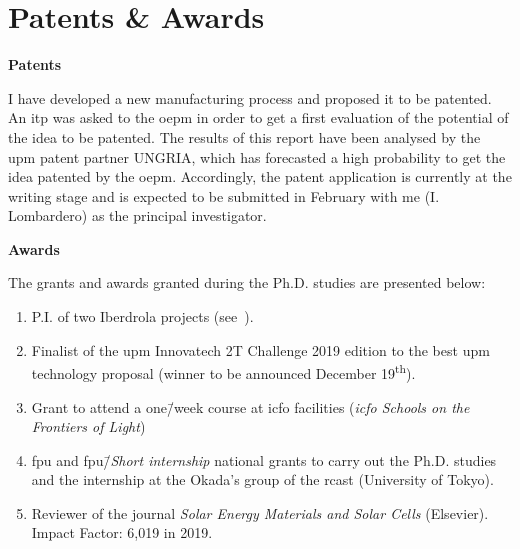 \chapter*{Patents \& Awards}\label{ch:Patents_Awards}

\begin{Large}
	\noindent\textbf{Patents}
\end{Large}

I have developed a new manufacturing process and proposed it to be patented. An \gls{itp} was asked to the \gls{oepm} in order to get a first evaluation of the potential of the idea to be patented. The results of this report have been analysed by the \gls{upm} patent partner UNGRIA, which has forecasted a high probability to get the idea patented by the \gls{oepm}. Accordingly, the patent application is currently at the writing stage and is expected to be submitted in February with me (I.\,Lombardero) as the principal investigator.\\\vspace{1cm}

\begin{Large}
	\noindent\textbf{Awards}
\end{Large}

The grants and awards granted during the Ph.D. studies are presented below:

\begin{enumerate}
	\item P.I. of two Iberdrola projects (see \sect\,).
	\item Finalist of the \gls{upm} Innovatech 2T Challenge 2019 edition to the best \gls{upm} technology proposal (winner to be announced December 19\textsuperscript{th}).
	\item Grant to attend a one\=/week course at \gls{icfo} facilities (\textit{\gls{icfo} Schools on the Frontiers of Light})
	\item \gls{fpu} and \gls{fpu}\=/\textit{Short internship} national grants to carry out the Ph.D. studies and the internship at the Okada's group of the \gls{rcast} (University of Tokyo).
	\item Reviewer of the journal \textit{Solar Energy Materials and Solar Cells} (Elsevier). Impact Factor: 6,019 in 2019.
\end{enumerate}